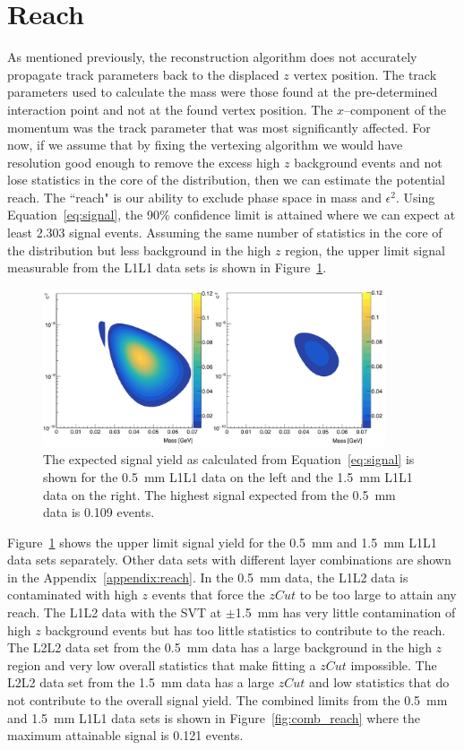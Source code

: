 \section{Reach}
As mentioned previously, the reconstruction algorithm does not accurately propagate track parameters back to the displaced $z$ vertex position. The track parameters used to calculate the mass were those found at the pre-determined interaction point and not at the found vertex position. The $x$--component of the momentum was the track parameter that was most significantly affected. For now, if we assume that by fixing the vertexing algorithm we would have resolution good enough to remove the excess high $z$ background events and not lose statistics in the core of the distribution, then we can estimate the potential reach. The ``reach" is our ability to exclude phase space in mass and $\epsilon^2$. Using Equation~\eqref{eq:signal}, the 90$\%$ confidence limit is attained where we can expect at least 2.303 signal events. Assuming the same number of statistics in the core of the distribution but less background in the high $z$ region, the upper limit signal measurable from the L1L1 data sets is shown in Figure~\ref{fig:L1L1_reach}.
\begin{figure}[htb]
  \centering
      \includegraphics[width=0.9\textwidth]{pics/results/reach_sets.png}
  \caption[Expected signal yield for the individual L1L1 data sets]{The expected signal yield as calculated from Equation~\eqref{eq:signal} is shown for the 0.5~mm L1L1 data on the left and the 1.5~mm L1L1 data on the right. The highest signal expected from the 0.5~mm data is 0.109 events.}
  \label{fig:L1L1_reach}
\end{figure} 
Figure~\ref{fig:L1L1_reach} shows the upper limit signal yield for the 0.5~mm and 1.5~mm L1L1 data sets separately. Other data sets with different layer combinations are shown in the Appendix~\ref{appendix:reach}. In the 0.5~mm data, the L1L2 data is contaminated with high $z$ events that force the $zCut$ to be too large to attain any reach. The L1L2 data with the SVT at $\pm$1.5~mm has very little contamination of high $z$ background events but has too little statistics to contribute to the reach. The L2L2 data set from the 0.5~mm data has a large background in the high $z$ region and very low overall statistics that make fitting a $zCut$ impossible. The L2L2 data set from the 1.5~mm data has a large $zCut$ and low statistics that do not contribute to the overall signal yield. The combined limits from the 0.5~mm and 1.5~mm L1L1 data sets is shown in Figure~\ref{fig:comb_reach} where the maximum attainable signal is 0.121 events. 

